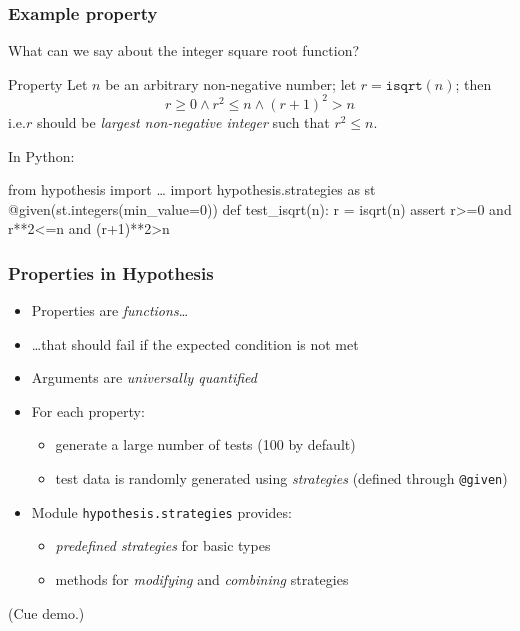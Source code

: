 \documentclass{beamer}
\begin{document}
\begin{frame}[fragile]
  \frametitle{Example property}

  What can we say about the integer square root function?
  \pause
  \medskip

  \begin{block}{Property}
    Let $n$ be an arbitrary non-negative number;
    let $r = \texttt{isqrt}(n)$; then
    \[ r\geq0 \land r^2 \leq n \land (r+1)^2>n  \]
    i.e.\@ $r$ should be \emph{largest non-negative integer} such that
  $r^2 \leq n$.
  \end{block}
  \pause
  \medskip

  In Python:
\begin{semiverbatim}
from hypothesis import \ldots
import hypothesis.strategies as st
@given(\alert<5>{st.integers(min_value=0)})  
def test_isqrt(\alert<4>{n}):                
    r = isqrt(n)
    assert \alert<6>{r>=0 and r**2<=n and (r+1)**2>n}   
  \end{semiverbatim}

\end{frame}

\begin{frame}
  \frametitle{Properties in Hypothesis}

  \begin{itemize}
  \item Properties are \emph{functions}\ldots
  \item \ldots that should fail if the expected condition is not met
  \item Arguments are \emph{universally quantified}
  \item For each property:
    \begin{itemize}
  \item generate a large number of tests (100 by default)
  \item test data is randomly generated using \emph{strategies}
  (defined through \texttt{@given})
    \end{itemize}
  \item Module \texttt{hypothesis.strategies} provides:
    \begin{itemize}
    \item \emph{predefined strategies} for basic types
    \item methods for \emph{modifying} and \emph{combining} strategies
    \end{itemize}
  \end{itemize}
\bigskip

  \hfill (Cue demo.)
\end{frame}
\end{document}
